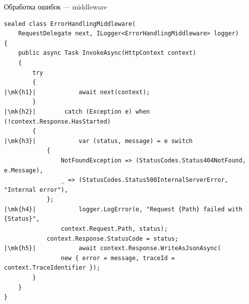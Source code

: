 \documentclass[aspectratio=169,10pt,t]{beamer}
\newcommand{\mk}[1]{\tikz[remember picture,overlay]\coordinate (#1) at (0,0.55ex);}
\begin{document}
\begin{frame}[fragile]{Обработка ошибок --- middleware}
  \vspace{0.2em}
\begin{lstlisting}[style=csharp,basicstyle=\ttfamily\fontsize{6.6}{7.2}\selectfont,escapechar=|]
sealed class ErrorHandlingMiddleware(
    RequestDelegate next, ILogger<ErrorHandlingMiddleware> logger)
{
    public async Task InvokeAsync(HttpContext context)
    {
        try
        {
|\mk{h1}|            await next(context);
        }
|\mk{h2}|        catch (Exception e) when (!context.Response.HasStarted)
        {
|\mk{h3}|            var (status, message) = e switch
            {
                NotFoundException => (StatusCodes.Status404NotFound, e.Message),
                _ => (StatusCodes.Status500InternalServerError, "Internal error"),
            };
|\mk{h4}|            logger.LogError(e, "Request {Path} failed with {Status}",
                context.Request.Path, status);
            context.Response.StatusCode = status;
|\mk{h5}|            await context.Response.WriteAsJsonAsync(
                new { error = message, traceId = context.TraceIdentifier });
        }
    }
}
\end{lstlisting}
\end{frame}
\end{document}
